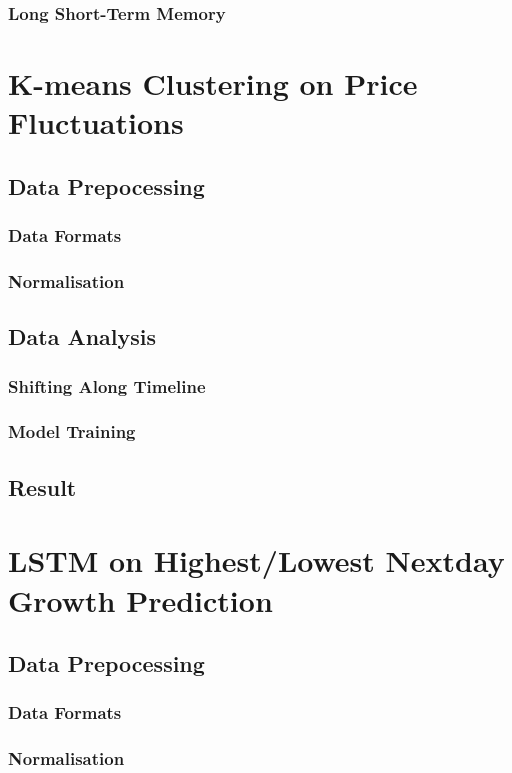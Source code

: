 \documentclass[11pt]{article} %
\theoremstyle{plain}
\theoremstyle{definition}
\begin{document}
\subsubsection{Long Short-Term Memory}

\section{K-means Clustering on Price Fluctuations}
\subsection{Data Prepocessing}
\subsubsection{Data Formats}
\subsubsection{Normalisation}
\subsection{Data Analysis}
\subsubsection{Shifting Along Timeline}
\subsubsection{Model Training}
\subsection{Result}

\clearpage

\section{LSTM on Highest/Lowest Nextday Growth Prediction}
\subsection{Data Prepocessing}
\subsubsection{Data Formats}
\subsubsection{Normalisation}
\end{document}
